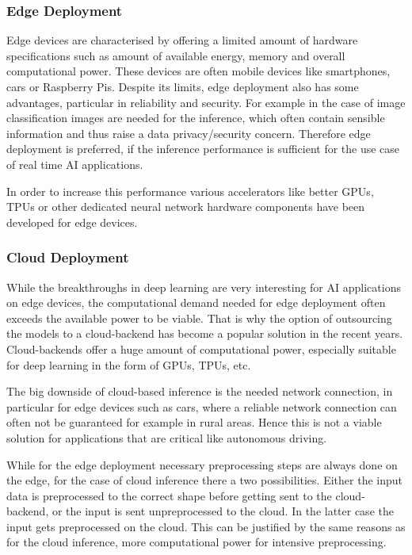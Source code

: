 \subsubsection{Edge Deployment}
Edge devices are characterised by offering a limited amount of hardware specifications such as amount of available energy, memory and overall computational power.
These devices are often mobile devices like smartphones, cars or Raspberry Pis.
Despite its limits, edge deployment also has some advantages, particular in reliability and security. 
For example in the case of image classification images are needed for the inference, which often contain sensible information and thus raise a data privacy/security concern.
Therefore edge deployment is preferred, if the inference performance is sufficient for the use case of real time AI applications.

In order to increase this performance various accelerators like better GPUs, TPUs or other dedicated neural network hardware components have been developed for edge devices.



\subsubsection{Cloud Deployment}
While the breakthroughs in deep learning are very interesting for AI applications on edge devices, the computational demand needed for edge deployment often exceeds the available power to be viable.
That is why the option of outsourcing the models to a cloud-backend has become a popular solution in the recent years.
Cloud-backends offer a huge amount of computational power, especially suitable for deep learning in the form of GPUs, TPUs, etc.


The big downside of cloud-based inference is the needed network connection, in particular for edge devices such as cars, where a reliable network connection can often not be guaranteed for example in rural areas. Hence this is not a viable solution for applications that are critical like autonomous driving.

While for the edge deployment necessary preprocessing steps are always done on the edge, for the case of cloud inference there a two possibilities. Either the input data is preprocessed to the correct shape before getting sent to the cloud-backend, or the input is sent unpreprocessed to the cloud. 
In the latter case the input gets preprocessed on the cloud. 
This can be justified by the same reasons as for the cloud inference, more computational power for intensive preprocessing.



